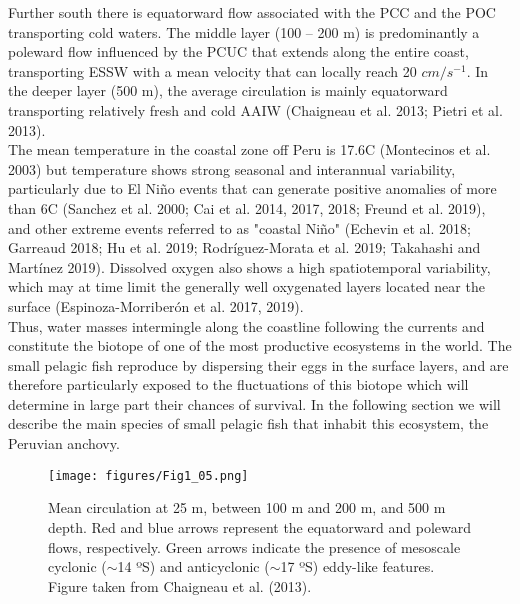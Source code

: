Further south there is equatorward flow associated with the PCC and the POC transporting cold waters. The middle layer (100 – 200 m) is predominantly a poleward flow influenced by the PCUC that extends along the entire coast, transporting ESSW with a mean velocity that can locally reach 20 $cm/s^{-1}$. In the deeper layer (500 m), the average circulation is mainly equatorward transporting relatively fresh and cold AAIW \citep{ChaiDomi2013,PietTest2013}(Chaigneau et al. 2013; Pietri et al. 2013).\\

The mean temperature in the coastal zone off Peru is 17.6\textdegree C \citep{Mont2003}(Montecinos et al. 2003) but temperature shows strong seasonal and interannual variability, particularly due to El Niño events that can generate positive anomalies of more than 6\textdegree C  \citep{Sanc2000,Cai2014,Cai2017,Cai2018,Freu2019}(Sanchez et al. 2000; Cai et al. 2014, 2017, 2018; Freund et al. 2019), and other extreme events referred to as "coastal Niño" \citep{Eche2018,Garr2018,Hu2019,Rodr2019,TakaMart2019}(Echevin et al. 2018; Garreaud 2018; Hu et al. 2019; Rodríguez-Morata et al. 2019; Takahashi and Martínez 2019). Dissolved oxygen also shows a high spatiotemporal variability, which may at time limit the generally well oxygenated layers located near the surface \citep{EspiEche2017,EspiEche2019}(Espinoza-Morriberón et al. 2017, 2019).\\

Thus, water masses intermingle along the coastline following the currents and constitute the biotope of one of the most productive ecosystems in the world. The small pelagic fish reproduce by dispersing their eggs in the surface layers, and are therefore particularly exposed to the fluctuations of this biotope which will determine in large part their chances of survival. In the following section we will describe the main species of small pelagic fish that inhabit this ecosystem, the Peruvian anchovy.\\

\begin{figure}[ht]
	\texttt{[image: figures/Fig1\_05.png]}
	\centering
	\caption{Mean circulation at 25 m, between 100 m and 200 m, and 500 m depth. Red and blue arrows represent the equatorward and poleward flows, respectively. Green arrows indicate the presence of mesoscale cyclonic ($\sim$14 ºS) and anticyclonic ($\sim$17 ºS) eddy-like features. Figure taken from \citep{ChaiDomi2013}Chaigneau et al. (2013).}
	\label{fig:Fig1_05}
\end{figure}

